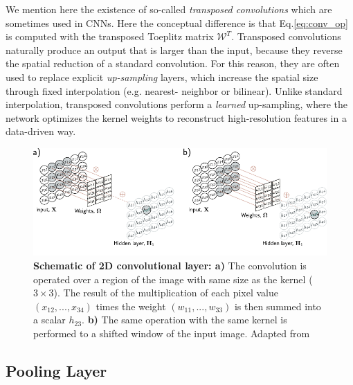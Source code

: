 We mention here the existence of so-called \textit{transposed convolutions} which are sometimes used in CNNs. Here the 
conceptual difference is that Eq.\ref{eq:conv_op} is computed with the transposed Toeplitz matrix $\mathcal{W}^T$. 
Transposed convolutions naturally produce an output that is larger 
than the input, because they reverse the spatial reduction of a standard convolution. For this reason, they are often used 
to replace explicit \textit{up-sampling} layers, which increase the spatial size through fixed interpolation (e.g. nearest-
neighbor or bilinear). Unlike standard interpolation, transposed convolutions perform a \textit{learned} up-sampling, 
where the network optimizes the kernel weights to reconstruct high-resolution features in a data-driven way. 

\begin{figure}[H]
    \centering
    \includegraphics[width=\textwidth]{figures/Intro/conv.pdf}
    \caption{\textbf{Schematic of 2D convolutional layer:  a) } The convolution is operated over a region of the image 
    with same size as the kernel ($3 \times 3$). The result of the multiplication of each pixel value $(x_{12},...,x_{34})$ 
    times the weight $(w_{11},...,w_{33})$ is then summed into a scalar $h_{23}$. \textbf{b)} The same operation with 
    the same kernel is performed to a shifted window of the input image.
    Adapted from \cite{prince2023understanding}}
    \label{fig:conv}
\end{figure}

\subsection{Pooling Layer}

